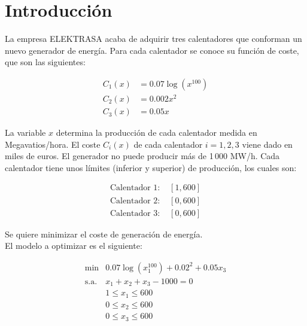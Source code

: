 \documentclass[12pt,a4paper,twoside,openright,titlepage,final]{article}
\author{José Ignacio Escribano}
\title{}
\begin{document}
\setcounter{page}{1}


\listoffigures
\thispagestyle{empty}
\newpage

\listoftables
\thispagestyle{empty}
\newpage

\tableofcontents
\thispagestyle{empty}
\newpage


\setcounter{page}{1}

\section{Introducción}

La empresa ELEKTRASA acaba de adquirir tres calentadores que conforman un nuevo generador de energía. Para cada calentador se conoce su función de coste, que son las siguientes:

\begin{align*}
C_1(x) & =  0.07\log(x^{100}) \\
C_2(x) & =  0.002x^2 \\
C_3(x) & =  0.05x
\end{align*}

La variable $x$ determina la producción de cada calentador medida en Megavatios/hora. El coste $C_i(x)$ de cada calentador $i=1,2,3$ viene dado en miles de euros. El generador no puede producir más de 1\,000 MW/h. Cada calentador tiene unos límites (inferior y superior) de producción, los cuales son:

\begin{eqnarray*}
\text{Calentador 1: } & [1, 600] \\
\text{Calentador 2: } & [0, 600] \\
\text{Calentador 3: } & [0, 600]
\end{eqnarray*}

Se quiere minimizar el coste de generación de energía.\\

El modelo a optimizar es el siguiente:

\begin{eqnarray*}
\mathrm{min} & 0.07\log(x_1^{100}) + 0.02^2 + 0.05x_3\\
\text{s.a.}  & x_1 + x_2 + x_3 - 1000 = 0 \\
             & 1 \leq x_1 \leq 600 \\
             & 0 \leq x_2 \leq 600 \\
             & 0 \leq x_3 \leq 600
\end{eqnarray*}
\end{document}
